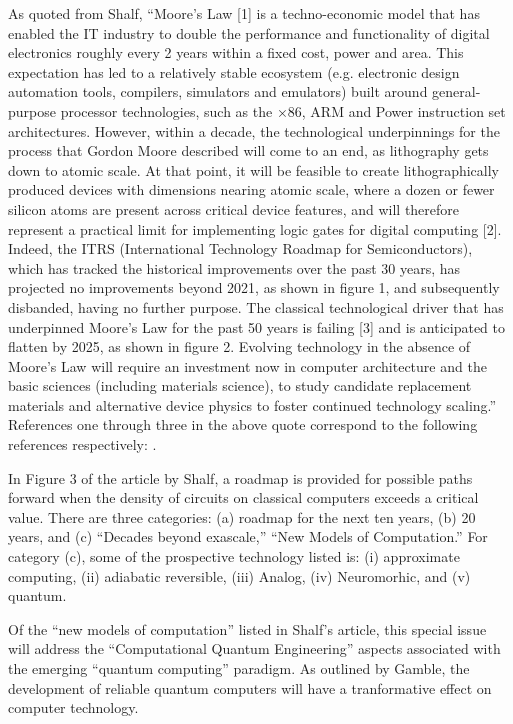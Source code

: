 \documentclass[]{article}
\begin{document}
As quoted from Shalf\cite{shalf2020future},
``Moore’s Law [1] is a techno-economic model that has enabled the IT industry to double the performance and functionality of digital electronics roughly every 2 years within a fixed cost, power and area. This expectation has led to a relatively stable ecosystem (e.g. electronic design automation tools, compilers, simulators and emulators) built around general-purpose processor technologies, such as the ×86, ARM and Power instruction set architectures. However, within a decade, the technological underpinnings for the process that Gordon Moore described will come to an end, as lithography gets down to atomic scale. At that point, it will be feasible to create lithographically produced devices with dimensions nearing atomic scale, where a dozen or fewer silicon atoms are present across critical device features, and will therefore represent a practical limit for implementing logic gates for digital computing [2]. Indeed, the ITRS (International Technology Roadmap for Semiconductors), which has tracked the historical improvements over the past 30 years, has projected no improvements beyond 2021, as shown in figure 1, and subsequently disbanded, having no further purpose. The classical technological driver that has underpinned Moore’s Law for the past 50 years is failing [3] and is anticipated to flatten by 2025, as shown in figure 2. Evolving technology in the absence of Moore’s Law will require an investment now in computer architecture and the basic sciences (including materials science), to study candidate replacement materials and alternative device physics to foster continued technology scaling.'' References one through three in the above quote 
correspond to the following references respectively: 
\cite{moore2021cramming}\cite{mack2015multiple}\cite{markov2014limits}.

In Figure 3 of the article by Shalf\cite{shalf2020future}, a roadmap is provided for possible paths forward when the density of circuits on classical computers exceeds a critical value.  There are three categories: (a) roadmap for the next ten years, (b) 20 years, and (c) ``Decades beyond exascale,'' ``New Models of Computation.'' For category (c), some of the prospective technology listed is:
(i) approximate computing, (ii) adiabatic reversible, (iii) Analog, (iv) Neuromorhic, and (v) quantum.

Of the ``new models of computation'' listed in 
Shalf's article\cite{shalf2020future}, this special issue will address
the ``Computational Quantum Engineering'' aspects associated with the
emerging ``quantum computing'' paradigm.  As outlined by
Gamble\cite{gamble2019quantum}, the development of reliable quantum
computers will have a tranformative effect on computer technology.
\end{document}
